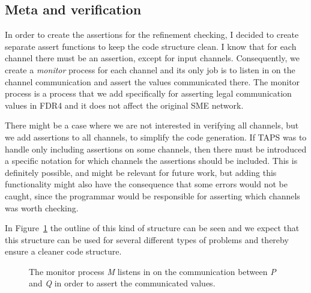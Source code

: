 \subsection{Meta and verification}

In order to create the assertions for the refinement checking, I decided to create separate assert functions to keep the code structure clean. I know that for each \cspm{} channel there must be an assertion, except for input channels.
Consequently, we create a \textit{monitor} process for each channel and its only job is to listen in on the channel communication and assert the values communicated there. The monitor process is a process that we add specifically for asserting legal communication values in FDR4 and it does not affect the original SME network.

There might be a case where we are not interested in verifying all channels, but we add assertions to all channels, to simplify the code generation. If TAPS was to handle only including assertions on some channels, then there must be introduced a specific notation for which channels the assertions should be included. This is definitely possible, and might be relevant for future work, but adding this functionality might also have the consequence that some errors would not be caught, since the programmar would be responsible for asserting which channels was worth checking.

In Figure~\ref{fig:assertion_process} the outline of this kind of structure can be seen and we expect that this structure can be used for several different types of problems and thereby ensure a cleaner code structure.
\begin{figure}[!ht]
  \centering
  \caption{The monitor process \textit{M} listens in on the communication between \textit{P} and \textit{Q} in order to assert the communicated values.}
  \label{fig:assertion_process}
\end{figure}

